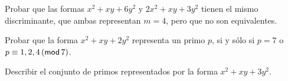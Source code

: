 \begin{ejerRepresentaciones}
	Probar que las formas
	$x^2+xy+6y^2$ y $2x^2+xy+3y^2$ tienen el mismo discriminante,
	que ambas representan $m=4$, pero que no son equivalentes.
\end{ejerRepresentaciones}

\begin{ejerRepresentaciones}
	Probar que la forma $x^2+xy+2y^2$ representa un primo $p$,
	si y s\'olo si $p=7$ o $p\equiv 1,2,4\tmodulo[7]$.
\end{ejerRepresentaciones}

\begin{ejerRepresentaciones}
	Describir el conjunto de primos representados por la forma
	$x^2+xy+3y^2$.
\end{ejerRepresentaciones}
